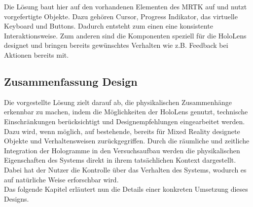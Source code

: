 Die Lösung baut hier auf den vorhandenen Elementen des MRTK auf und nutzt vorgefertigte Objekte. Dazu gehören Cursor, Progress Indikator, das virtuelle Keyboard und Buttons. Dadurch entsteht zum einen eine konsistente Interaktionsweise. Zum anderen sind die Komponenten speziell für die HoloLens designet und bringen bereits gewünschtes Verhalten wie z.B. Feedback bei Aktionen bereits mit.\\

\subsection{Zusammenfassung Design}
Die vorgestellte Lösung zielt darauf ab, die physikalischen Zusammenhänge erkennbar zu machen, indem die Möglichkeiten der HoloLens genutzt, technische Einschränkungen berücksichtigt und Designempfehlungen eingearbeitet werden. Dazu wird, wenn möglich, auf bestehende, bereits für Mixed Reality designete Objekte und Verhaltensweisen zurückgegriffen. Durch die räumliche und zeitliche Integration der Hologramme in den Versuchsaufbau werden die physikalischen Eigenschaften des Systems direkt in ihrem tatsächlichen Kontext dargestellt. Dabei hat der Nutzer die Kontrolle über das Verhalten des Systems, wodurch es auf natürliche Weise erforschbar wird.\\

Das folgende Kapitel erläutert nun die Details einer konkreten Umsetzung dieses Designs.

